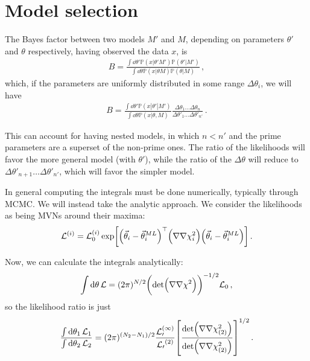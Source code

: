 \documentclass[main.tex]{subfiles}
\begin{document}
\chapter{Model selection}


The Bayes factor between two models \(M'\) and \(M\), depending on parameters \(\theta'\) and \(\theta \) respectively, having observed the data \(x\), is 
%
\begin{align}
B = \frac{\int \dd{\theta '} \mathbb{P}(x | \theta ' M') \mathbb{P}(\theta ' | M')}{\int \dd{\theta } \mathbb{P}(x | \theta  M) \mathbb{P}(\theta  | M)}
\,,
\end{align}
%
which, if the parameters are uniformly distributed in some range \(\Delta \theta _i\), we will have 
%
\begin{align}
B = \frac{\int \dd{\theta '} \mathbb{P}(x | \theta ' | M')}{\int \dd{\theta } \mathbb{P}(x | \theta , M)} \frac{\Delta \theta _1 \dots \Delta \theta _n}{\Delta \theta '_1 \dots \Delta \theta '_{n'}}
\,.
\end{align}

This can account for having nested models, in which \(n < n'\) and the prime parameters are a superset of the non-prime ones.
The ratio of the likelihoods will favor the more general model (with \(\theta '\)), while the ratio of the \(\Delta \theta \) will reduce to \(\Delta \theta'_{n+1} \dots \Delta \theta '_{n'}\), which will favor the simpler model. 

In general computing the integrals must be done numerically, typically through MCMC.
We will instead take the analytic approach. 
We consider the likelihoods as being MVNs around their maxima: 
%
\begin{align}
\mathcal{L}^{(i)} = \mathcal{L}_0^{(i)} \exp[
    \qty(\vec{\theta}_i - \vec{\theta}_i^{ML})^{\top}
    \qty(\nabla \nabla \chi^2_i)
    \qty(\vec{\theta}_i - \vec{\theta}_i^{ML})
]
\,.
\end{align}

Now, we can calculate the integrals analytically: 
%
\begin{align}
\int \dd{\theta } \mathcal{L} = (2 \pi )^{N/2} \qty(\det (\nabla \nabla \chi^2))^{-1/2} \mathcal{L}_0
\,,
\end{align}
%
so the likelihood ratio is just 
%
\begin{align}
\frac{\int \dd{\theta _1} \mathcal{L}_1}{\int \dd{\theta _2} \mathcal{L}_2} = (2 \pi )^{(N_2 - N_1) / 2 } \frac{\mathcal{L_0^{(1)}}}{\mathcal{L_0}^{(2)}} \qty[\frac{\det (\nabla \nabla \chi^2_{(2)})}{\det (\nabla \nabla \chi^2_{(2)})}]^{1/2}
\,.
\end{align}
\end{document}
